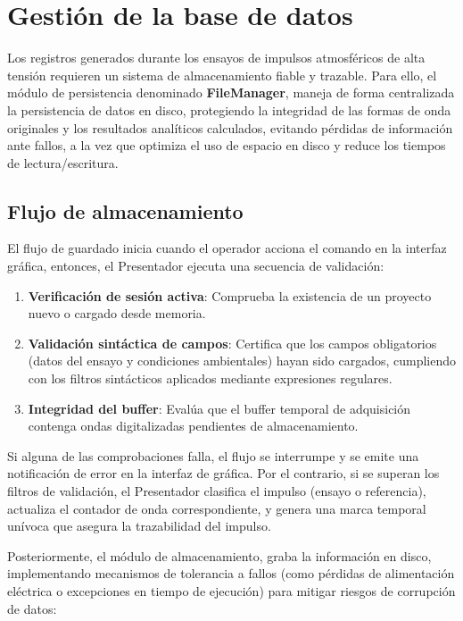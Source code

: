 \section{Gestión de la base de datos}
\label{sec:gestion_base_datos}

Los registros generados durante los ensayos de impulsos atmosféricos de alta tensión requieren un sistema de almacenamiento fiable y trazable. Para ello, el módulo de persistencia denominado \textbf{FileManager}, maneja de forma centralizada la persistencia de datos en disco, protegiendo la integridad de las formas de onda originales y los resultados analíticos calculados, evitando pérdidas de información ante fallos, a la vez que optimiza el uso de espacio en disco y reduce los tiempos de lectura/escritura.

\subsection{Flujo de almacenamiento}
\label{subsec:flujo_almacenamiento}

El flujo de guardado inicia cuando el operador acciona el comando en la interfaz gráfica, entonces, el Presentador ejecuta una secuencia de validación:
\begin{enumerate}
    \item \textbf{Verificación de sesión activa}: Comprueba la existencia de un proyecto nuevo o cargado desde memoria.
    \item \textbf{Validación sintáctica de campos}: Certifica que los campos obligatorios (datos del ensayo y condiciones ambientales) hayan sido cargados, cumpliendo con los filtros sintácticos aplicados mediante expresiones regulares.
    \item \textbf{Integridad del buffer}: Evalúa que el buffer temporal de adquisición contenga ondas digitalizadas pendientes de almacenamiento.
\end{enumerate}

Si alguna de las comprobaciones falla, el flujo se interrumpe y se emite una notificación de error en la interfaz de gráfica. Por el contrario, si se superan los filtros de validación, el Presentador clasifica el impulso (ensayo o referencia), actualiza el contador de onda correspondiente, y genera una marca temporal unívoca que asegura la trazabilidad del impulso.

Posteriormente, el módulo de almacenamiento, graba la información en disco, implementando mecanismos de tolerancia a fallos (como pérdidas de alimentación eléctrica o excepciones en tiempo de ejecución) para mitigar riesgos de corrupción de datos:

